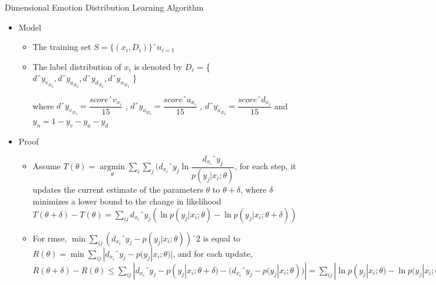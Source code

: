 \documentclass[
 size=14pt,
 paper=smartboard,  %
 mode=present, 		%
 display=slides, 	%
 style=tuliplab,  	%
 pauseslide,
 fleqn,leqno]{powerdot}
\begin{document}
%
\begin{slide}{Dimensional Emotion Distribution Learning Algorithm}

\begin{itemize}
	\item Model
	
	\begin{itemize}
		\item 
		The training set $ S = \{ ( x_{i} , D_{i} )  \} ˆn_{ i = 1 } $
		\item 
		The label distribution of $ x_{i}  $ is denoted by 
		$ D_{i} $ = \{ 
		$ d ˆ {y_{v}} _{ x_{i} } , 
		d ˆ {y_{a}} _{ x_{i} } ,
		d ˆ {y_{d}} _{ x_{i} } ,
		d ˆ {y_{n}} _{ x_{i} }  $ \}
		
		where $ d ˆ {y_{v}} _{ x_{i} }  = \dfrac{scoreˆ{v}_{ x_{i} }} {15} $ , 
		 $ d ˆ {y_{a}} _{ x_{i} }  = \dfrac{scoreˆ{a}_{ x_{i} }} {15} $ ,
		  $d ˆ {y_{a}} _{ x_{i} }= \dfrac{scoreˆ{d}_{ x_{i} }}{15} $ 
		  and $ y_{n} = 1 - y_{v}  - y_{a} - y_{d} $
	\end{itemize}

	\item 
	Proof
	
	\begin{itemize}
		\item 
		Assume $ T(\theta) =  \mathop{\arg\min}\limits_{\theta}
		\sum\limits_{i}
		\sum\limits_{j}
		( d_{ x_{ i } } ˆ{ y_{ j } }
		\ln \dfrac{ d_{ x_{ i } } ˆ{ y_{ j } } }{ p( y_{ j } | x_{ i } ;{\theta}) } $,
		for each step, it updates the current estimate of the parameters 
		\textbf{$\theta$} to \textbf{ $\theta + \delta$},
		where \textbf{$ \delta $} minimizes a lower bound to the change in likelihood
		$ T(\theta + \delta) - T(\theta) = \sum\limits_{ij} 
		 d_{ x_{ i } } ˆ{ y_{ j } } (
		 \ln p( y_{ j } | x_{ i } ;{\theta}) -
		 \ln p( y_{ j } | x_{ i } ;{\theta + \delta}) )$
		 
		 \item 
		 For rmse,
		 $ \mathop{\min}\sum\limits_{ij}
		  (d_{ x_{ i } } ˆ{ y_{ j } }  - 
		  p( y_{ j } | x_{ i } ;{\theta}))ˆ2$
		  is equal to 
		  $ R(\theta) = \mathop{\min} \sum\limits_{ij}
		  |d_{ x_{ i } } ˆ{ y_{ j } }  - 
		  p( y_{ j } | x_{ i } ;{\theta})| $,
		  and for each update,
		  $ R(\theta + \delta) - R(\theta) 
		  \leq  
		  \sum\limits_{ij} |
		  d_{ x_{ i } } ˆ{ y_{ j } }  - 
		  p( y_{ j } | x_{ i } ;{\theta + \delta}) - 
		  (d_{ x_{ i } } ˆ{ y_{ j } }  - 
		  p( y_{ j } | x_{ i } ;{\theta})) | =
		  \sum\limits_{ij}
		  | \ln p( y_{ j } | x_{ i } ;{\theta}) -
		  \ln p( y_{ j } | x_{ i } ;{\theta + \delta}) |$
		 
	\end{itemize}
\end{itemize}

\end{slide}
\end{document}
